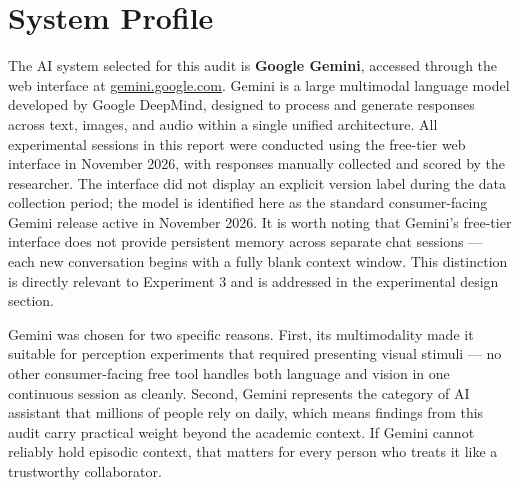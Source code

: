 \documentclass[12pt, a4paper]{article}
\begin{document}
\section{System Profile}

The AI system selected for this audit is \textbf{Google Gemini}, accessed through the web interface at \url{gemini.google.com}. Gemini is a large multimodal language model developed by Google DeepMind, designed to process and generate responses across text, images, and audio within a single unified architecture. All experimental sessions in this report were conducted using the free-tier web interface in November 2026, with responses manually collected and scored by the researcher. The interface did not display an explicit version label during the data collection period; the model is identified here as the standard consumer-facing Gemini release active in November 2026. It is worth noting that Gemini's free-tier interface does not provide persistent memory across separate chat sessions — each new conversation begins with a fully blank context window. This distinction is directly relevant to Experiment 3 and is addressed in the experimental design section.

Gemini was chosen for two specific reasons. First, its multimodality made it suitable for perception experiments that required presenting visual stimuli — no other consumer-facing free tool handles both language and vision in one continuous session as cleanly. Second, Gemini represents the category of AI assistant that millions of people rely on daily, which means findings from this audit carry practical weight beyond the academic context. If Gemini cannot reliably hold episodic context, that matters for every person who treats it like a trustworthy collaborator.
\end{document}
